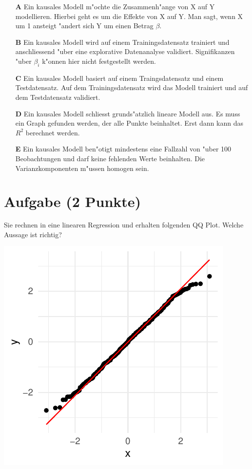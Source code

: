 \documentclass[a4paper, 9pt]{scrartcl}\usepackage[]{graphicx}\usepackage[]{xcolor}
\makeatletter
\def\maxwidth{ %
  \ifdim\Gin@nat@width>\linewidth
    \linewidth
  \else
    \Gin@nat@width
  \fi
}
\makeatother
\begin{document}
\begin{enumerate}
\item [\textbf{A} \msquare] Ein kausales Modell m{"o}chte die Zusammenh{"a}nge von X auf Y modellieren. Hierbei geht es um die Effekte von X auf Y. Man sagt, wenn X um 1 ansteigt {"a}ndert sich Y um einen Betrag $\beta$.
\item [\textbf{B} \msquare] Ein kausales Modell wird auf einem Trainingsdatensatz trainiert und anschliessend {"u}ber eine explorative Datenanalyse validiert. Signifikanzen {"u}ber $\beta_i$ k{"o}nnen hier nicht festgestellt werden.
\item [\textbf{C} \msquare] Ein kausales Modell basiert auf einem Traingsdatensatz und einem Testdatensatz. Auf dem Trainingsdatensatz wird das Modell trainiert und auf dem Testdatensatz validiert.
\item [\textbf{D} \msquare] Ein kausales Modell schliesst grunds{"a}tzlich lineare Modell aus. Es muss ein Graph gefunden werden, der alle Punkte beinhaltet. Erst dann kann das $R^2$ berechnet werden.
\item [\textbf{E} \msquare] Ein kausales Modell ben{"o}tigt mindestens eine Fallzahl von {"u}ber 100 Beobachtungen und darf keine fehlenden Werte beinhalten. Die Varianzkomponenten m{"u}ssen homogen sein.
\end{enumerate}

\section{Aufgabe \hfill (2 Punkte)}

Sie rechnen in eine linearen Regression und erhalten folgenden QQ
Plot. Welche Aussage ist richtig?




{\centering \includegraphics[width=\maxwidth]{img/mc-regression-05-a-1} 

}
\end{document}
